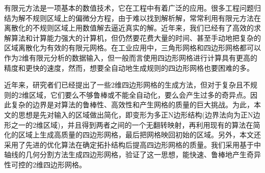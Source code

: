 \begin{cnabstract}
有限元方法是一项基本的数值技术，它在工程中有着广泛的应用。很多工程问题归结为解不规则区域上的偏微分方程，由于难以找到解析解，常常利用有限元方法在离散化的不规则区域上用数值解去逼近真实的解。近年来，我们已经有了高效的求解算法和计算能力强大的计算机，但仍然要花费大量的时间、甚至手动地把复杂的区域离散化为有效的有限元网格。在工业应用中，三角形网格和四边形网格都可以作为2维有限元分析的数据输入，但一般而言使用四边形网格进行计算具有更高的精度和更快的速度，然而，想要全自动地生成规则的四边形网格也要困难的多。

近年来，研究者们已经提出了一些2维四边形网格的生成方法，但对于复杂且不规则的2维区域，它们要么不够鲁棒或不能全自动化，要么会产生过多的奇异点。因此复杂的边界是对算法的鲁棒性、高效性和产生网格的质量的巨大挑战。为此，本文的思想是先对输入的区域做出简化，即变形为多正N边形结构(边界法向为正N边形之一的2维区域)，并且得到两者之间的一个无翻转映射，再利用现有的算法在简化的区域上生成高质量的四边形网格，最后把网格映回初始的区域。另外，本文还采用了先进的优化算法在确定拓扑结构后提高四边形网格的质量。我们采用基于中轴线的几何分割方法生成四边形网格，验证了这一思想，能快速、鲁棒地产生奇异性可控的2维四边形网格。



\end{cnabstract}

